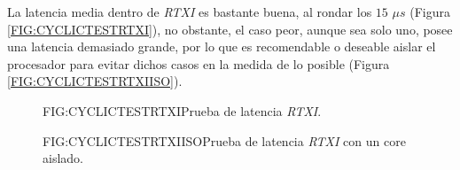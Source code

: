 
La latencia media dentro de \textit{RTXI} es bastante buena, al rondar los $15$ $\mu s$ (Figura \ref{FIG:CYCLICTESTRTXI}), no obstante, el caso peor, aunque sea solo uno, posee una latencia demasiado grande, por lo que es recomendable o deseable aislar el procesador para evitar dichos casos en la medida de lo posible (Figura \ref{FIG:CYCLICTESTRTXIISO}).

\begin{figure}[Prueba de latencia RTXI]{FIG:CYCLICTESTRTXI}{Prueba de latencia \textit{RTXI}.}
\end{figure}

\begin{figure}[Prueba de latencia RTXI con un core aislado]{FIG:CYCLICTESTRTXIISO}{Prueba de latencia \textit{RTXI} con un core aislado.}
\end{figure}
